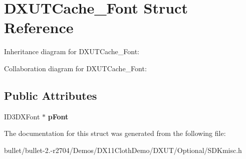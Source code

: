 \hypertarget{struct_d_x_u_t_cache___font}{\section{D\+X\+U\+T\+Cache\+\_\+\+Font Struct Reference}
\label{struct_d_x_u_t_cache___font}
}


Inheritance diagram for D\+X\+U\+T\+Cache\+\_\+\+Font\+:


Collaboration diagram for D\+X\+U\+T\+Cache\+\_\+\+Font\+:
\subsection*{Public Attributes}
\begin{DoxyCompactItemize}
\item 
\hypertarget{struct_d_x_u_t_cache___font_a248189d7049578ebe1a0ce37d516cac9}{I\+D3\+D\+X\+Font $\ast$ {\bfseries p\+Font}}\label{struct_d_x_u_t_cache___font_a248189d7049578ebe1a0ce37d516cac9}

\end{DoxyCompactItemize}


The documentation for this struct was generated from the following file\+:\begin{DoxyCompactItemize}
\item 
bullet/bullet-\/2.-\/r2704/\+Demos/\+D\+X11\+Cloth\+Demo/\+D\+X\+U\+T/\+Optional/S\+D\+Kmisc.\+h\end{DoxyCompactItemize}
